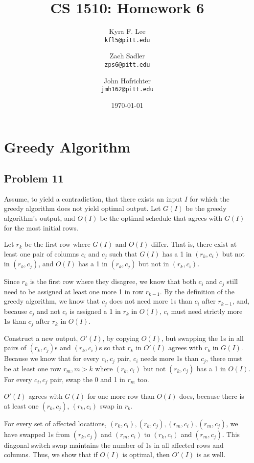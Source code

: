 \documentclass[12pt]{article}
\title{CS 1510: Homework 6}
\author{Kyra F. Lee \\
			 \texttt{kfl5@pitt.edu}
	\and
Zach Sadler \\\texttt{zps6@pitt.edu}
  \and
  John Hofrichter\\\texttt{jmh162@pitt.edu}}
\date{\today}
\begin{document}
\maketitle
\section*{Greedy Algorithm}
	\subsection*{Problem 11}
		Assume, to yield a contradiction, that there exists an input $I$ for which the greedy algorithm
				does not yield optimal output. Let $G(I)$ be the greedy algorithm's output, and $O(I)$ be
				the optimal schedule that agrees with $G(I)$ for the most initial rows.
		
		Let $r_{k}$ be the first row where $G(I)$ and $O(I)$ differ. That is, there exist at least one
				pair of columns $c_{i}$ and $c_{j}$ such that $G(I)$ has a 1 in $(r_{k}, c_{i})$ but not in 
				$(r_{k}, c_{j})$, and $O(I)$ has a 1 in $(r_{k}, c_{j})$ but not in  $(r_{k}, c_{i})$.
					
		Since $r_{k}$ is the first row where they disagree, we know that both $c_{i}$ and $c_{j}$
				still need to be assigned at least one more 1 in row $r_{k-1}$. By the definition of the
				greedy algorithm, we know that $c_{j}$ does not need more 1s than $c_{i}$ after
				$r_{k-1}$, and, because $c_{j}$ and not $c_{i}$ is assigned a 1 in $r_{k}$ in $O(I)$,
				$c_{i}$ must need strictly more 1s than $c_{j}$ after $r_{k}$ in $O(I)$.
					
		Construct a new output, $O'(I)$, by copying $O(I)$, but swapping the 1s in all pairs of
				$(r_{k}, c_{j})$s and $(r_{k}, c_{i})$s so that $r_{k}$ in $O'(I)$ agrees with $r_{k}$ in
				$G(I)$. Because we know that for every $c_{i}, c_{j}$ pair, $c_{i}$ needs more 1s than
				$c_{j}$, there must be at least one row $r_{m}, m > k$ where $(r_{k}, c_{i})$ but not
				$(r_{k}, c_{j})$ has a 1 in $O(I)$. For every $c_{i}, c_{j}$ pair, swap the 0 and 1 in $r_{m}$ too.
				
		$O'(I)$ agrees with $G(I)$ for one more row than $O(I)$ does, because there is at
				least one $(r_{k}, c_{j})$, $(r_{k}, c_{i})$ swap in $r_{k}$.
		
		For every set of affected locations, $(r_{k}, c_{i}), (r_{k}, c_{j}), (r_{m}, c_{i}), (r_{m}, c_{j})$, we
				have swapped 1s from $(r_{k}, c_{j})$ and $(r_{m}, c_{i})$ to $(r_{k}, c_{i})$ and $(r_{m}, c_{j})$.
				This diagonal switch swap maintains the number of 1s in all affected rows and columns.
				Thus, we show that if $O(I)$ is optimal, then $O'(I)$ is as well.
				
\end{document}
